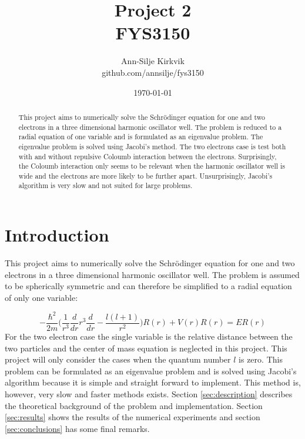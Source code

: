 \documentclass{article}
\begin{document}
\title{\vspace{1cm}Project 2 \\ FYS3150}

\author{\vspace{1cm}Ann-Silje Kirkvik \\ github.com/annsilje/fys3150}
\date{\vspace{5cm}\today}

\maketitle

\newpage

\begin{abstract}
This project aims to numerically solve the Schr\"odinger equation for one and two electrons in a three dimensional harmonic oscillator well. The problem is reduced to a radial equation of one variable and is formulated as an eigenvalue problem. The eigenvalue problem is solved using Jacobi's method. The two electrons case is test both with and without repulsive Coloumb interaction between the electrons. Surprisingly, the Coloumb interaction only seems to be relevant when the harmonic oscillator well is wide and the electrons are more likely to be further apart. Unsurprisingly, Jacobi's algorithm is very slow and not suited for large problems. 
\end{abstract}

\vspace{1cm}


\section{Introduction}
This project aims to numerically solve the Schr\"odinger equation for one and two electrons in a three dimensional harmonic oscillator well. The problem is assumed to be spherically symmetric and can therefore be simplified to a radial equation of only one variable: 

\begin{equation}
-\frac{\hbar^2}{2m}\big( \frac{1}{r^3}\frac{d}{dr}r^3\frac{d}{dr} - \frac{l(l+1)}{r^2} \big)R(r) + V(r)R(r) = ER(r)
\label{eq:schrodinger_org}
\end{equation}
For the two electron case the single variable is the relative distance between the two particles and the center of mass equation is neglected in this project. This project will only consider the cases when the quantum number $l$ is zero. This problem can be formulated as an eigenvalue problem and is solved using Jacobi's algorithm because it is simple and straight forward to implement. This method is, however, very slow and faster methods exists. Section \ref{sec:description} describes the theoretical background of the problem and implementation. Section \ref{sec:results} shows the results of the numerical experiments and section \ref{sec:conclusions} has some final remarks.
\end{document}
